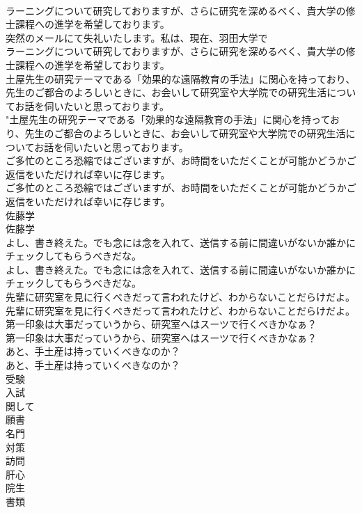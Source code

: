 \documentclass[8pt]{extreport}
\begin{document}
\begin{CJK}{UTF8}{min}
\\	ラーニングについて研究しておりますが、さらに研究を深めるべく、貴大学の修士課程への進学を希望しております。	
\\	突然のメールにて失礼いたします。私は、現在、羽田大学で
\\	ラーニングについて研究しておりますが、さらに研究を深めるべく、貴大学の修士課程への進学を希望しております。 
\\	土屋先生の研究テーマである「効果的な遠隔教育の手法」に関心を持っており、先生のご都合のよろしいときに、お会いして研究室や大学院での研究生活についてお話を伺いたいと思っております。	
\\	"土屋先生の研究テーマである「効果的な遠隔教育の手法」に関心を持っており、先生のご都合のよろしいときに、お会いして研究室や大学院での研究生活についてお話を伺いたいと思っております。 
\\	ご多忙のところ恐縮ではございますが、お時間をいただくことが可能かどうかご返信をいただければ幸いに存じます。	
\\	ご多忙のところ恐縮ではございますが、お時間をいただくことが可能かどうかご返信をいただければ幸いに存じます。 
\\	佐藤学	
\\	佐藤学 
\\	よし、書き終えた。でも念には念を入れて、送信する前に間違いがないか誰かにチェックしてもらうべきだな。	
\\	よし、書き終えた。でも念には念を入れて、送信する前に間違いがないか誰かにチェックしてもらうべきだな。 
\\	先輩に研究室を見に行くべきだって言われたけど、わからないことだらけだよ。	
\\	先輩に研究室を見に行くべきだって言われたけど、わからないことだらけだよ。 
\\	第一印象は大事だっていうから、研究室へはスーツで行くべきかなぁ？	
\\	第一印象は大事だっていうから、研究室へはスーツで行くべきかなぁ？ 
\\	あと、手土産は持っていくべきなのか？	
\\	あと、手土産は持っていくべきなのか？ 
\\	受験
\\	入試
\\	関して
\\	願書
\\	名門
\\	対策
\\	訪問
\\	肝心
\\	院生
\\	書類

\end{CJK}
\end{document}
